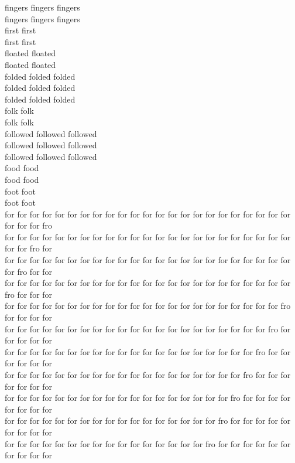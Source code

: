 fingers fingers fingers\\
fingers fingers fingers\\
first first\\
first first\\
floated floated\\
floated floated\\
folded folded folded\\
folded folded folded\\
folded folded folded\\
folk folk\\
folk folk\\
followed followed followed\\
followed followed followed\\
followed followed followed\\
food food\\
food food\\
foot foot\\
foot foot\\
for for for for for for for for for for for for for for for for for for for for for for for for for for fro\\
for for for for for for for for for for for for for for for for for for for for for for for for for fro for\\
for for for for for for for for for for for for for for for for for for for for for for for for fro for for\\
for for for for for for for for for for for for for for for for for for for for for for for fro for for for\\
for for for for for for for for for for for for for for for for for for for for for for fro for for for for\\
for for for for for for for for for for for for for for for for for for for for for fro for for for for for\\
for for for for for for for for for for for for for for for for for for for for fro for for for for for for\\
for for for for for for for for for for for for for for for for for for for fro for for for for for for for\\
for for for for for for for for for for for for for for for for for for fro for for for for for for for for\\
for for for for for for for for for for for for for for for for for fro for for for for for for for for for\\
for for for for for for for for for for for for for for for for fro for for for for for for for for for for\\
